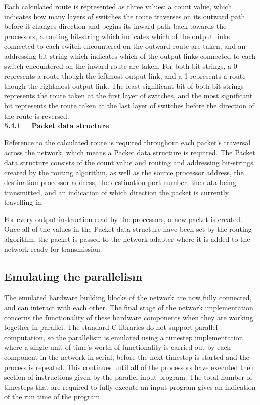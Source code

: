 \documentclass[a4paper, 12pt]{article}
\begin{document}
Each calculated route is represented as three values: a count value, which indicates how many layers of switches the route traverses on its outward path before it changes direction and begins its inward path back towards the processors, a routing bit-string which indicates which of the output links connected to each switch encountered on the outward route are taken, and an addressing bit-string which indicates which of the output links connected to each switch encountered on the inward route are taken. For both bit-strings, a 0 represents a route though the leftmost output link, and a 1 represents a route though the rightmost output link. The least significant bit of both bit-strings represents the route taken at the first layer of switches, and the most significant bit represents the route taken at the last layer of switches before the direction of the route is reversed.\\

\noindent\textbf{5.4.1 \ \ Packet data structure}

\noindent Reference to the calculated route is required throughout each packet's traversal across the network, which means a Packet data structure is required. The Packet data structure consists of the count value and routing and addressing bit-strings created by the routing algorithm, as well as the source processor address, the destination processor address, the destination port number, the data being transmitted, and an indication of which direction the packet is currently travelling in. 

For every output instruction read by the processors, a new packet is created. Once all of the values in the Packet data structure have been set by the routing algorithm, the packet is passed to the network adapter where it is added to the network ready for transmission.

\subsection{Emulating the parallelism}
\label{sec:imp_parallelism}

The emulated hardware building blocks of the network are now fully connected, and can interact with each other. The final stage of the network implementation concerns the functionality of these hardware components when they are working together in parallel. The standard C libraries do not support parallel computation, so the parallelism is emulated using a timestep implementation where a single unit of time's worth of functionality is carried out by each component in the network in serial, before the next timestep is started and the process is repeated. This continues until all of the processors have executed their section of instructions given by the parallel input program. The total number of timesteps that are required to fully execute an input program gives an indication of the run time of the program.
\end{document}
